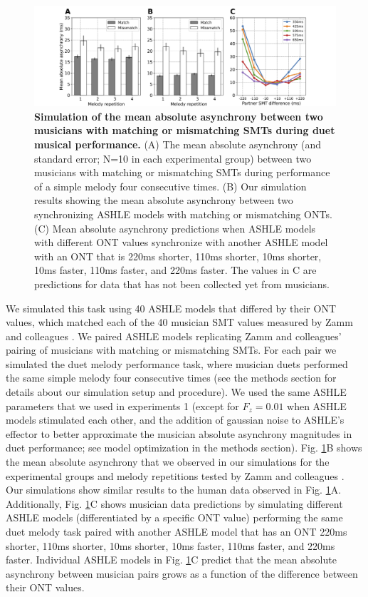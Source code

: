 \documentclass{report}
\begin{document}
\begin{figure}
    \centering
    \includegraphics[width=1.0\textwidth]{figures/fig3_4.png}
    \caption[Simulation of the mean absolute asynchrony between two musicians with matching or mismatching SMTs during duet musical performance]{\textbf{Simulation of the mean absolute asynchrony between two musicians with matching or mismatching SMTs during duet musical performance.} (A) The mean absolute asynchrony (and standard error; N=10 in each experimental group) between two musicians with matching or mismatching SMTs during performance of a simple melody four consecutive times. (B) Our simulation results showing the mean absolute asynchrony between two synchronizing ASHLE models with matching or mismatching ONTs. (C) Mean absolute asynchrony predictions when ASHLE models with different ONT values synchronize with another ASHLE model with an ONT that is 220ms shorter, 110ms shorter, 10ms shorter, 10ms faster, 110ms faster, and 220ms faster. The values in C are predictions for data that has not been collected yet from musicians.}
    \label{f3_4}
\end{figure}

We simulated this task using 40 ASHLE models that differed by their ONT values, which matched each of the 40 musician SMT values measured by Zamm and colleagues \cite{zamm2016endogenous}. We paired ASHLE models replicating Zamm and colleagues' \cite{zamm2016endogenous} pairing of musicians with matching or mismatching SMTs. For each pair we simulated the duet melody performance task, where musician duets performed the same simple melody four consecutive times (see the methods section for details about our simulation setup and procedure). We used the same ASHLE parameters that we used in experiments 1 (except for $F_z = 0.01$ when ASHLE models stimulated each other, and the addition of gaussian noise to ASHLE's effector to better approximate the musician absolute asynchrony magnitudes in duet performance; see model optimization in the methods section). Fig.{} \ref{f3_4}B shows the mean absolute asynchrony that we observed in our simulations for the experimental groups and melody repetitions tested by Zamm and colleagues \cite{zamm2016endogenous}. Our simulations show similar results to the human data observed in Fig.{} \ref{f3_4}A. Additionally, Fig.{} \ref{f3_4}C shows musician data predictions by simulating different ASHLE models (differentiated by a specific ONT value) performing the same duet melody task paired with another ASHLE model that has an ONT 220ms shorter, 110ms shorter, 10ms shorter, 10ms faster, 110ms faster, and 220ms faster. Individual ASHLE models in Fig.{} \ref{f3_4}C predict that the mean absolute asynchrony between musician pairs grows as a function of the difference between their ONT values. 
\end{document}
